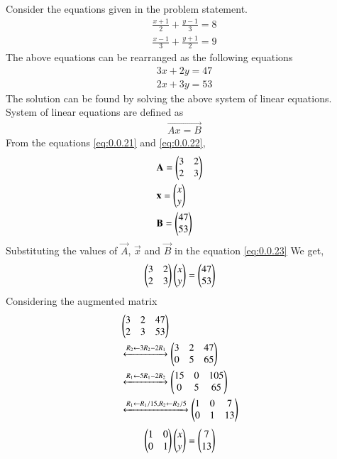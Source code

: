 \documentclass[journal,12pt,twocolumn]{IEEEtran}
\renewcommand\thesection{\arabic{section}}
\begin{document}
\begin{enumerate}[label=\thesection.\arabic*.,ref=\thesection.\theenumi]
\solution Consider the equations given in the problem statement.
\begin{align}
\displaystyle\frac{x+1}{2}+\displaystyle\frac{y-1}{3}=8\\
\displaystyle\frac{x-1}{3}+\displaystyle\frac{y+1}{2}=9
\end{align}
The above equations can be rearranged as the following equations
\begin{align}
3x+2y=47 \label{eq:0.0.21}\\
2x+3y=53 \label{eq:0.0.22}
\end{align}
The solution can be found by solving the above system of linear equations.\\ 
System of linear equations are defined as 
\begin{align}
\vec{Ax=B} \label{eq:0.0.23}
\end{align}
From the equations \eqref{eq:0.0.21} and \eqref{eq:0.0.22}, 
\begin{align}
&\vec{A}= \myvec{3 &2\\2 & 3}&\\
\medskip
&\vec{x}= \myvec{ x\\ y}&\\
\medskip
&\vec{B}= \myvec{47\\53}&  
\end{align} 
Substituting the values of $\vec{A}$, $\vec{x}$ and $\vec{B}$ in the equation \eqref{eq:0.0.23}
We get,
\begin{align}
&\begin{pmatrix}3&2\\2&3\end{pmatrix} \begin{pmatrix}x\\y\end{pmatrix}= \begin{pmatrix}47\\53\end{pmatrix}&
\end{align}
Considering the augmented matrix 
 \begin{align}
& \begin{pmatrix}3&2&47\\2&3&53\end{pmatrix}&
 \\
&\xleftrightarrow[]{ R_2 \leftarrow 3R_2 - 2R_1}
 \begin{pmatrix}3&2&47\\0&5&65\end{pmatrix}&\\
 &\xleftrightarrow[]{ R_1 \leftarrow 5R_1 - 2R_2}
 \begin{pmatrix}15&0&105\\0&5&65\end{pmatrix}&\\
 &\xleftrightarrow[]{ R_1 \leftarrow R_1/15,R_2\leftarrow R_2/5}
 \begin{pmatrix}1&0&7\\0&1&13\end{pmatrix}&
 \end{align}
 \begin{align}
&\myvec{1&0\\0&1} \myvec{x\\y}= \myvec{7\\13}& \label{eq:0.0.32}

\end{align}
\end{enumerate}
\end{document}
